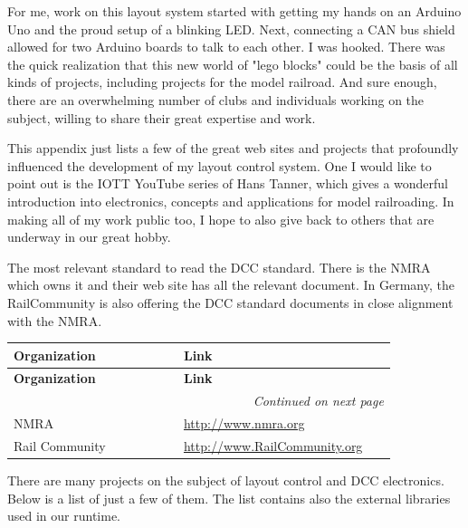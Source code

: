 
For me, work on this layout system started with getting my hands on an Arduino Uno and the proud setup of a blinking LED. Next, connecting a CAN bus shield allowed for two Arduino boards to talk to each other. I was hooked. There was the quick realization that this new world of "lego blocks" could be the basis of all kinds of projects, including projects for the model railroad. And sure enough, there are an overwhelming number of clubs and individuals working on the subject, willing to share their great expertise and work. 

This appendix just lists a few of the great web sites and projects that profoundly influenced the development of my layout control system. One I would like to point out is the IOTT YouTube series of Hans Tanner, which gives a wonderful introduction into electronics, concepts and applications for model railroading. In making all of my work public too, I hope to also give back to others that are underway in our great hobby.


The most relevant standard to read the DCC standard. There is the NMRA which owns it and their web site has all the relevant document. In Germany, the RailCommunity is also offering the DCC standard documents in close alignment with the NMRA.

\begin{longtable}{|p{0.4\linewidth}|p{0.5\linewidth}|}
    \toprule
    \textbf{Organization} & \textbf{Link} \\
    \midrule
    \endfirsthead
    \toprule
    \textbf{Organization} & \textbf{Link} \\
    \midrule
    \endhead
    \midrule
    \multicolumn{2}{r}{\textit{Continued on next page}} \\
    \midrule
    \endfoot
    \bottomrule
    \endlastfoot
    NMRA & \url{http://www.nmra.org}  \\
    \midrule
    Rail Community & \url{http://www.RailCommunity.org}  \\
    \midrule
\end{longtable}


There are many projects on the subject of layout control and DCC electronics. Below is a list of just a few of them. The list contains also the external libraries used in our runtime.

